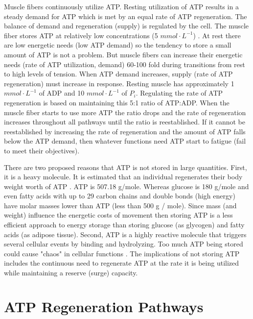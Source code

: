 Muscle fibers continuously utilize ATP. Resting utilization of ATP results in a steady demand for ATP which is met by an equal rate of ATP regeneration. The balance of demand and regeneration (supply) is regulated by the cell. The muscle fiber stores ATP at relatively low concentrations (5 $mmol \cdot L^{-1}$) \cite{feher_quantitative_2017, jones_skeletal_2006}. At rest there are low energetic needs (low ATP demand) so the tendency to store a small amount of ATP is not a problem. But muscle fibers can increase their energetic needs (rate of ATP utilization, demand) 60-100 fold during transitions from rest to high levels of tension. When ATP demand increases, supply (rate of ATP regeneration) must increase in response. Resting muscle has approximately 1 $mmol \cdot L^{-1}$ of ADP and 10 $mmol \cdot L^{-1}$ of $P_i$. Regulating the rate of ATP regeneration is based on maintaining this 5:1 ratio of ATP:ADP. When the muscle fiber starts to use more ATP the ratio drops and the rate of regeneration increases throughout all pathways until the ratio is reestablished. If it cannot be reestablished by increasing the rate of regeneration and the amount of ATP falls below the ATP demand, then whatever functions need ATP start to fatigue (fail to meet their objectives). 

There are two proposed reasons that ATP is not stored in large quantities. First, it is a heavy molecule. It is estimated that an individual regenerates their body weight worth of ATP \cite{tornroth-horsefield_opening_2008}. ATP is 507.18 g/mole. Whereas glucose is 180 g/mole and even fatty acids with up to 29 carbon chains and double bonds (high energy) have molar masses lower than ATP (less than 500 g / mole). Since mass (and weight) influence the energetic costs of movement then storing ATP is a less efficient approach to energy storage than storing glucose (as glycogen) and fatty acids (as adipose tissue). Second, ATP is a highly reactive molecule that triggers several cellular events by binding and hydrolyzing. Too much ATP being stored could cause "chaos" in cellular functions \cite{jones_skeletal_2006}. The implications of not storing ATP includes the continuous need to regenerate ATP at the rate it is being utilized while maintaining a reserve (surge) capacity.



\section{ATP Regeneration Pathways}

